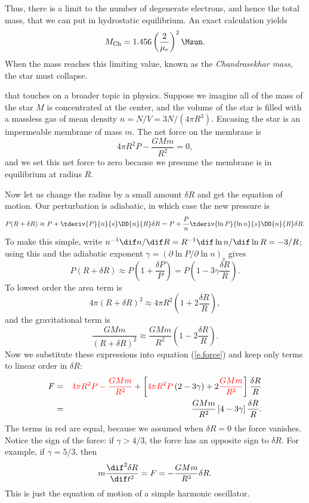 Thus, there is a limit to the number of degenerate electrons, and hence the total mass, that we can put in hydrostatic equilibrium.  An exact calculation yields
\begin{equation}\label{e.Chandrasekhar}
	M_{\mathrm{Ch}} = 1.456 \left(\frac{2}{\mu_{e}}\right)^{2}\Msun.
\end{equation}
When the mass reaches this limiting value, known as the \emph{Chandrasekhar mass}, the star must collapse.  

\cite{Cox1980Theory-of-Stell} that touches on a broader topic in physics.  Suppose we imagine all of the mass of the star $M$ is concentrated at the center, and the volume of the star is filled with a massless gas of mean density $n = N/V = 3N/(4\pi R^{3})$. Encasing the star is an impermeable membrane of mass $m$.  The net force on the membrane is
\begin{equation}\label{e.force}
	4\pi R^{2} P - \frac{GMm}{R^{2}} = 0,
\end{equation}
and we set this net force to zero because we presume the membrane is in equilibrium at radius $R$.

Now let us change the radius by a small amount $\delta R$ and get the equation of motion. Our perturbation is adiabatic, in which case the new pressure is
\[ 
	P(R+\delta R) \approx P + \tderiv{P}{n}{s}\DD{n}{R}\delta R 
	= P + \frac{P}{n}\tderiv{\ln P}{\ln n}{s} \DD{n}{R}\delta R. 
\]
To make this simple, write $n^{-1}\dif n/\dif R = R^{-1}\dif\ln n/\dif\ln R = -3/R$; using this and the adiabatic exponent $\gamma = (\partial\ln P/\partial\ln n)_{s}$ gives
\[
	P(R+\delta R) \approx P\left(1 + \frac{\delta P}{P}\right) 
	= P\left(1 - 3\gamma \frac{\delta R}{R}\right).
\]
To lowest order the area term is
\[ 4\pi (R+\delta R)^{2} \approx 4\pi R^{2}\left(1 + 2\frac{\delta R}{R}\right), \]
and the gravitational term is
\[
	\frac{GMm}{(R+\delta R)^{2}} \approx \frac{GMm}{R^{2}}\left(1-2\frac{\delta R}{R}\right).
\]
Now we substitute these expressions into equation (\ref{e.force}) and keep only terms to linear order in $\delta R$:
\begin{eqnarray}
	F &=& \color{red} 4\pi R^{2} P - \frac{GMm}{R^{2}}
	\color{black} + \left[{\color{red}4\pi R^{2}P}\left( 2 - 3\gamma \right) + 2 {\color{red}\frac{GMm}{R^{2}}} \right ] \frac{\delta R}{R} \nonumber\\
	&=& \frac{GMm}{R^{2}} \left[4 - 3\gamma\right]\frac{\delta R}{R}.
\end{eqnarray}
The terms in red are equal, because we assumed when $\delta R = 0$ the force vanishes.  Notice the sign of the force: if $\gamma > 4/3$, the force has an opposite sign to $\delta R$. For example, if $\gamma = 5/3$, then 
\begin{equation}\label{e.SHO}
	m\frac{\dif^{2}\delta R}{\dif t^{2}} = F  = - \frac{GMm}{R^{3}}\delta R.
\end{equation}
This is just the equation of motion of a simple harmonic oscillator.

